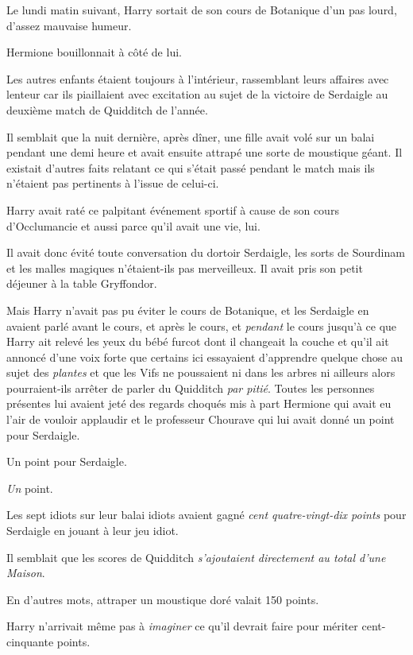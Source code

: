 \later

Le lundi matin suivant, Harry sortait de son cours de Botanique d'un pas lourd, d'assez mauvaise humeur.

Hermione bouillonnait à côté de lui.

Les autres enfants étaient toujours à l'intérieur, rassemblant leurs affaires avec lenteur car ils piaillaient avec excitation au sujet de la victoire de Serdaigle au deuxième match de Quidditch de l'année.

Il semblait que la nuit dernière, après dîner, une fille avait volé sur un balai pendant une demi heure et avait ensuite attrapé une sorte de moustique géant. Il existait d'autres faits relatant ce qui s'était passé pendant le match mais ils n'étaient pas pertinents à l'issue de celui-ci.

Harry avait raté ce palpitant événement sportif à cause de son cours d'Occlumancie et aussi parce qu'il avait une vie, lui.

Il avait donc évité toute conversation du dortoir Serdaigle, les sorts de Sourdinam et les malles magiques n'étaient-ils pas merveilleux. Il avait pris son petit déjeuner à la table Gryffondor.

Mais Harry n'avait pas pu éviter le cours de Botanique, et les Serdaigle en avaient parlé avant le cours, et après le cours, et \emph{pendant} le cours jusqu'à ce que Harry ait relevé les yeux du bébé furcot dont il changeait la couche et qu'il ait annoncé d'une voix forte que certains ici essayaient d'apprendre quelque chose au sujet des \emph{plantes} et que les Vifs ne poussaient ni dans les arbres ni ailleurs alors pourraient-ils arrêter de parler du Quidditch \emph{par pitié}. Toutes les personnes présentes lui avaient jeté des regards choqués mis à part Hermione qui avait eu l'air de vouloir applaudir et le professeur Chourave qui lui avait donné un point pour Serdaigle.

Un point pour Serdaigle.

\emph{Un} point.

Les sept idiots sur leur balai idiots avaient gagné \emph{cent quatre-vingt-dix points} pour Serdaigle en jouant à leur jeu idiot.

Il semblait que les scores de Quidditch \emph{s'ajoutaient directement au total d'une Maison}.

En d'autres mots, attraper un moustique doré valait 150 points.

Harry n'arrivait même pas à \emph{imaginer} ce qu'il devrait faire pour mériter cent-cinquante points.

